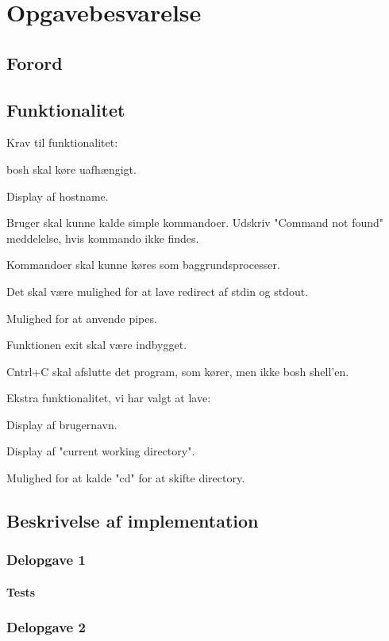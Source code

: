 \chapter{Opgavebesvarelse}
\section{Forord}

\section{Funktionalitet}
Krav til funktionalitet:
\begin{my_enumerate}
\item bosh skal køre uafhængigt.
\item Display af hostname.
\item Bruger skal kunne kalde simple kommandoer. Udskriv "Command not found" meddelelse, hvis kommando ikke findes.
\item Kommandoer skal kunne køres som baggrundsprocesser.
\item Det skal være mulighed for at lave redirect af stdin og stdout.
\item Mulighed for at anvende pipes.
\item Funktionen exit skal være indbygget.
\item Cntrl+C skal afslutte det program, som kører, men ikke bosh shell'en.
\end{my_enumerate}

Ekstra funktionalitet, vi har valgt at lave:
\begin{my_enumerate}
\item Display af brugernavn.
\item Display af "current working directory".
\item Mulighed for at kalde "cd" for at skifte directory.
\end{my_enumerate}

\section{Beskrivelse af implementation}
\subsection{Delopgave 1}
\subsubsection{Tests}
\subsection{Delopgave 2}
